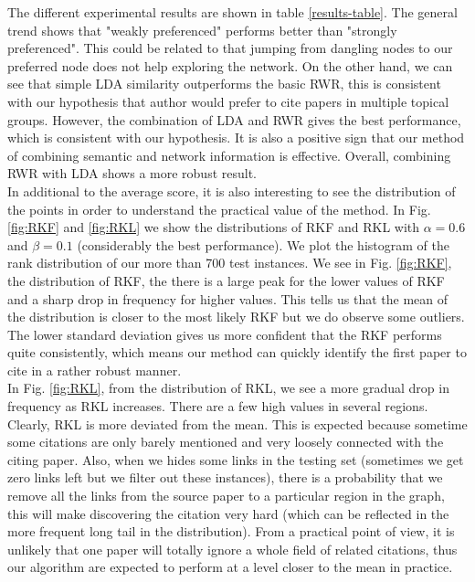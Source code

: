 \documentclass{article} %
\begin{document}
The different experimental results are shown in table \ref{results-table}. The general trend shows that "weakly preferenced" performs better than "strongly preferenced". This could be related to that jumping from dangling nodes to our preferred node does not help exploring the network. On the other hand, we can see that simple LDA similarity outperforms the basic RWR, this is consistent with our hypothesis that author would prefer to cite papers in multiple topical groups. However, the combination of LDA and RWR gives the best performance, which is consistent with our hypothesis. It is also a positive sign that our method of combining semantic and network information is effective. Overall, combining RWR with LDA shows a more robust result.\\
In additional to the average score, it is also interesting to see the distribution of the points in order to understand the practical value of the method. In Fig. \ref{fig:RKF} and \ref{fig:RKL} we show the distributions of RKF and RKL with $\alpha=0.6$ and $\beta=0.1$ (considerably the best performance). We plot the histogram of the rank distribution of our more than 700 test instances. We see in Fig. \ref{fig:RKF}, the distribution of RKF, the there is a large peak for the lower values of RKF and a sharp drop in frequency for higher values. This tells us that the mean of the distribution is closer to the most likely RKF but we do observe some outliers. The lower standard deviation gives us more confident that the RKF performs quite consistently, which means our method can quickly identify the first paper to cite in a rather robust manner.\\
In Fig. \ref{fig:RKL}, from the distribution of RKL, we see a more gradual drop in frequency as RKL increases. There are a few high values in several regions. Clearly, RKL is more deviated from the mean. This is expected because sometime some citations are only barely mentioned and very loosely connected with the citing paper. Also, when we hides some links in the testing set (sometimes we get zero links left but we filter out these instances), there is a probability that we remove all the links from the source paper to a particular region in the graph, this will make discovering the citation very hard (which can be reflected in the more frequent long tail in the distribution). From a practical point of view, it is unlikely that one paper will totally ignore a whole field of related citations, thus our algorithm are expected to perform at a level closer to the mean in practice.\\
\end{document}
